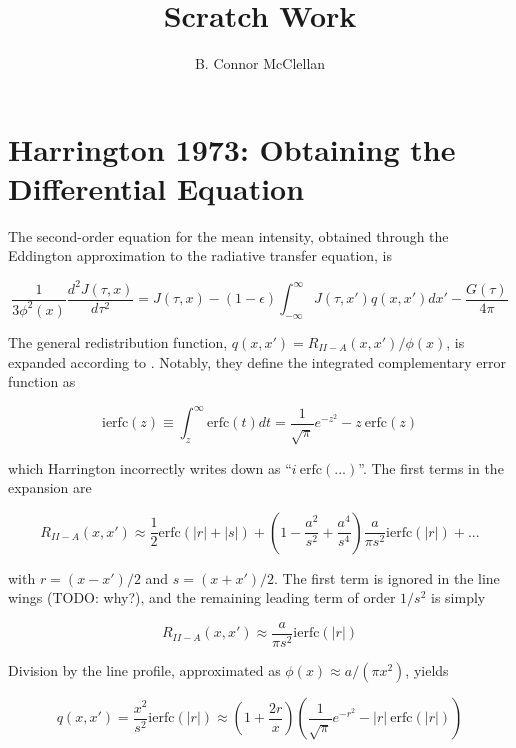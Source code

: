 \documentclass[onecolumn]{aastex63}
\begin{document}
\title{Scratch Work}
\author{B. Connor McClellan}
\keywords{}

\setlength\parindent{0pt}

\section{Harrington 1973: Obtaining the Differential Equation}

The second-order equation for the mean intensity, obtained through the Eddington approximation to the radiative transfer equation, is

\begin{equation} \label{harrington1}
    \frac{1}{3\phi^2(x)}\frac{d^2J(\tau, x)}{d\tau^2} = J(\tau, x) - (1-\epsilon)\int_{-\infty}^{\infty}J(\tau, x')q(x, x')dx' - \frac{G(\tau)}{4\pi}
\end{equation}

The general redistribution function, $q(x, x') = R_{II-A}(x, x')/\phi (x)$, is expanded according to \cite{1971JQSRT..11.1365A}. Notably, they define the integrated complementary error function as 

\begin{equation}
    \mathrm{ierfc}(z) \equiv \int_z^{\infty} \mathrm{erfc}(t) dt = \frac{1}{\sqrt{\pi}} e^{-z^2} - z\  \mathrm{erfc}(z)
\end{equation}

which Harrington incorrectly writes down as ``$i\ \mathrm{erfc(...)}$''. The first terms in the expansion are 


\begin{equation}
    R_{II-A}(x, x') \approx \frac{1}{2}\mathrm{erfc}(|r|+|s|) + \left(1 - \frac{a^2}{s^2} + \frac{a^4}{s^4}\right) \frac{a}{\pi s^2} \mathrm{ierfc}(|r|) + ...
\end{equation}

with $r=(x-x')/2$ and $s=(x+x')/2$. The first term is ignored in the line wings (TODO: why?), and the remaining leading term of order $1/s^2$ is simply

\begin{equation}
    R_{II-A}(x, x') \approx \frac{a}{\pi s^2}\mathrm{ierfc}(|r|)
\end{equation}

Division by the line profile, approximated as $\phi(x) \approx a/(\pi x^2)$, yields

\begin{equation}
    q(x, x') = \frac{x^2}{s^2} \mathrm{ierfc}(|r|) \approx \left(1+\frac{2r}{x}\right)\left(\frac{1}{\sqrt{\pi}}e^{-r^2} - |r|\ \mathrm{erfc}(|r|)\right)
\end{equation}
\end{document}
